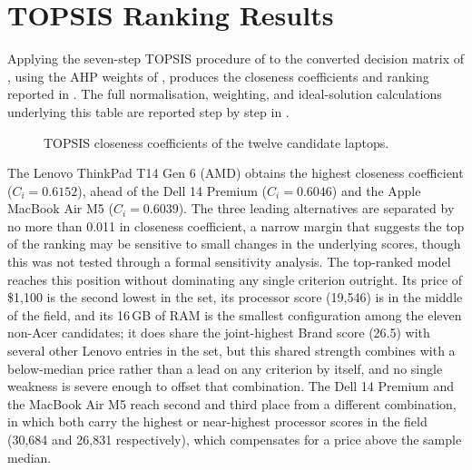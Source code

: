 \section{TOPSIS Ranking Results}\label{sec:ranking}

Applying the seven-step TOPSIS procedure of  to the converted
decision matrix of , using the AHP weights of
, produces the closeness coefficients and ranking reported in
. The full normalisation, weighting, and ideal-solution
calculations underlying this table are reported step by step in .



\begin{figure}[H]
  \centering
  \caption{TOPSIS closeness coefficients of the twelve candidate laptops.}
  \label{fig:topsis-coefficients}
\end{figure}

The Lenovo ThinkPad T14 Gen 6 (AMD) obtains the highest closeness coefficient
($C_i = 0.6152$), ahead of the Dell 14 Premium ($C_i = 0.6046$) and the Apple MacBook Air M5
($C_i = 0.6039$). The three leading alternatives are separated by no more than 0.011 in
closeness coefficient, a narrow margin that suggests the top of the ranking may be
sensitive to small changes in the underlying scores, though this was not tested through a
formal sensitivity analysis. The top-ranked model reaches this position without dominating
any single criterion outright. Its price of \$1{,}100 is the second lowest in the set, its
processor score (19{,}546) is in the middle of the field, and its 16\,GB of RAM is the
smallest configuration among the eleven non-Acer candidates; it does share the
joint-highest Brand score (26.5) with several other Lenovo entries in the set, but this
shared strength combines with a below-median price rather than a lead on any criterion by
itself, and no single weakness is severe enough to offset that combination. The Dell 14
Premium and the MacBook Air M5 reach second and third place from a different combination,
in which both carry the highest or near-highest processor scores in the field (30{,}684
and 26{,}831 respectively), which compensates for a price above the sample median.

